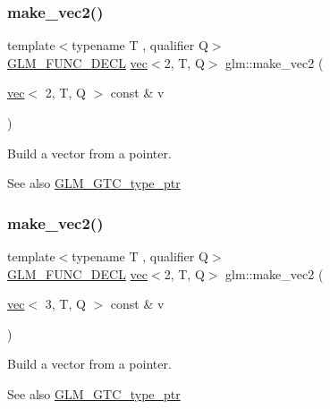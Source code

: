 \subsubsection{\texorpdfstring{make\+\_\+vec2()}{make\_vec2()}\hspace{0.1cm}{\footnotesize\ttfamily [2/5]}}
{\footnotesize\ttfamily template$<$typename T , qualifier Q$>$ \\
\mbox{\hyperlink{setup_8hpp_ab2d052de21a70539923e9bcbf6e83a51}{G\+L\+M\+\_\+\+F\+U\+N\+C\+\_\+\+D\+E\+CL}} \mbox{\hyperlink{structglm_1_1vec}{vec}}$<$2, T, Q$>$ glm\+::make\+\_\+vec2 (\begin{DoxyParamCaption}\item[{\mbox{\hyperlink{structglm_1_1vec}{vec}}$<$ 2, T, Q $>$ const \&}]{v }\end{DoxyParamCaption})\hspace{0.3cm}{\ttfamily [inline]}}

Build a vector from a pointer. \begin{DoxySeeAlso}{See also}
\mbox{\hyperlink{group__gtc__type__ptr}{G\+L\+M\+\_\+\+G\+T\+C\+\_\+type\+\_\+ptr}} 
\end{DoxySeeAlso}
\mbox{\label{group__gtc__type__ptr_ga0084fea4694cf47276e9cccbe7b1015a}} 
\subsubsection{\texorpdfstring{make\+\_\+vec2()}{make\_vec2()}\hspace{0.1cm}{\footnotesize\ttfamily [3/5]}}
{\footnotesize\ttfamily template$<$typename T , qualifier Q$>$ \\
\mbox{\hyperlink{setup_8hpp_ab2d052de21a70539923e9bcbf6e83a51}{G\+L\+M\+\_\+\+F\+U\+N\+C\+\_\+\+D\+E\+CL}} \mbox{\hyperlink{structglm_1_1vec}{vec}}$<$2, T, Q$>$ glm\+::make\+\_\+vec2 (\begin{DoxyParamCaption}\item[{\mbox{\hyperlink{structglm_1_1vec}{vec}}$<$ 3, T, Q $>$ const \&}]{v }\end{DoxyParamCaption})\hspace{0.3cm}{\ttfamily [inline]}}

Build a vector from a pointer. \begin{DoxySeeAlso}{See also}
\mbox{\hyperlink{group__gtc__type__ptr}{G\+L\+M\+\_\+\+G\+T\+C\+\_\+type\+\_\+ptr}} 
\end{DoxySeeAlso}
\mbox{\label{group__gtc__type__ptr_ga2b81f71f3a222fe5bba81e3983751249}} 
